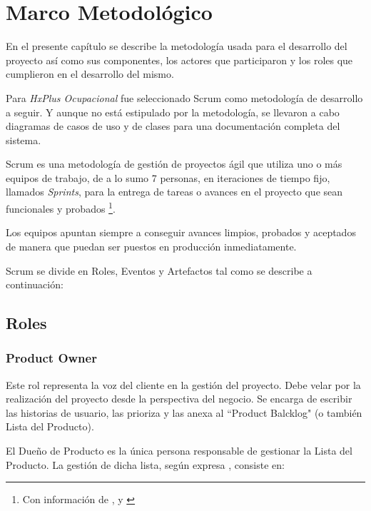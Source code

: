 \chapter{Marco Metodológico}

    En el presente capítulo se describe la metodología usada para el desarrollo del proyecto así como sus componentes, los actores que participaron y los roles que cumplieron en el desarrollo del mismo.

    Para \textit{HxPlus Ocupacional} fue seleccionado Scrum como metodología de desarrollo a seguir. Y aunque no está estipulado por la metodología, se llevaron a cabo diagramas de casos de uso y de clases para una documentación completa del sistema.
    
    Scrum es una metodología de gestión de proyectos ágil que utiliza uno o más equipos de trabajo, de a lo sumo 7 personas, en iteraciones de tiempo fijo, llamados \textit{Sprints}, para la entrega de tareas o avances en el proyecto que sean funcionales y probados
    \footnote{Con información de \citeauthor{scrum-guia}\cite{scrum-guia}, \citeauthor{scrum-primer}\cite{scrum-primer} y \citeauthor{scrum-agile}\cite{scrum-agile}}.    
    
    Los equipos apuntan siempre a conseguir avances limpios, probados y aceptados de manera que puedan ser puestos en producción inmediatamente.
    
    Scrum se divide en Roles, Eventos y Artefactos tal como se describe a continuación:

    \section{Roles}
        
        \subsection{Product Owner}
        \label{product-owner}
        
        Este rol representa la voz del cliente en la gestión del proyecto. Debe velar por la realización del proyecto desde la perspectiva del negocio. Se encarga de escribir las historias de usuario, las prioriza y las anexa al ``Product Balcklog" (o también Lista del Producto).
        
        El Dueño de Producto es la única persona responsable de gestionar la Lista del Producto. La gestión de dicha lista, según expresa \citeauthor{scrum-guia}\cite{scrum-guia}, consiste en:
        
